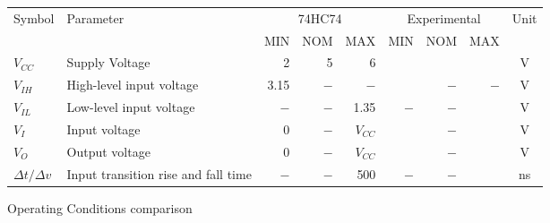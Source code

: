 \begin{tabular}{|l|l|r|r|r|r|r|r|c|}
    \toprule
    Symbol  &Parameter  &\multicolumn{3}{|c|}{74HC74}&\multicolumn{3}{|c|}{Experimental}&Unit\\
            &           &   MIN&NOM&MAX&MIN&NOM&MAX&\\
    \midrule
    $V_{CC}$&Supply Voltage&2&5&6&  &  &  &V\\
    $V_{IH}$&High-level input voltage&3.15&$-$&$-$&   &$-$&$-$&V\\
    $V_{IL}$&Low-level input voltage&$-$&$-$&1.35&$-$&$-$&  &V\\
    $V_{I}$ &Input voltage&0&$-$&$V_{CC}$&  &$-$&   &V\\
    $V_{O}$ &Output voltage&0&$-$&$V_{CC}$&  &$-$&   &V\\
    $\Delta t / \Delta v$&  Input transition \newline rise and fall time&$-$&$-$&500&$-$&$-$&   &ns\\
    \bottomrule
\end{tabular}
\caption{Operating Conditions comparison}